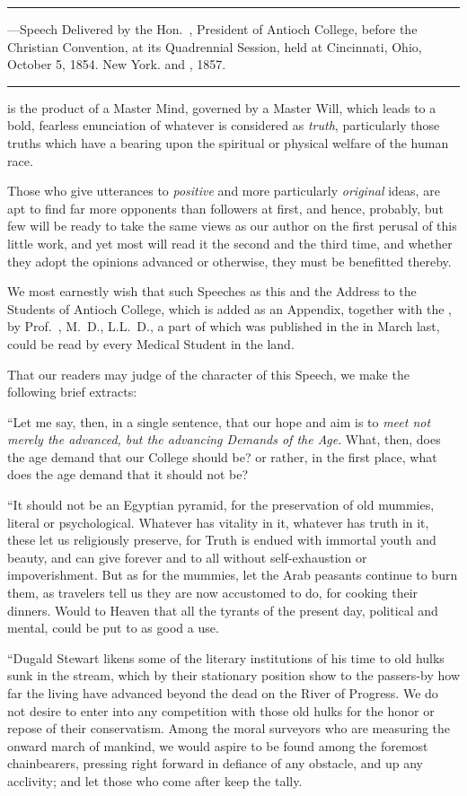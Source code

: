 
\fancybreak{* * *}
\footnotesize
{}---Speech Delivered by the Hon.~, President of
Antioch College, before the Christian Convention, at its Quadrennial Session, held at
Cincinnati, Ohio, October 5, 1854. New York.  and , 1857.
\plainbreak{1}
\normalsize

 is the product of a Master Mind, governed by a Master Will,
which leads to a bold, fearless enunciation of whatever is considered as
\emph{truth}, particularly those truths which have a bearing upon the spiritual
or physical welfare of the human race.

Those who give utterances to \emph{positive} and more particularly \emph{original}
ideas, are apt to find far more opponents than followers at first, and
hence, probably, but few will be ready to take the same views as our
author on the first perusal of this little work, and yet most will read it
the second and the third time, and whether they adopt the opinions
advanced or otherwise, they must be benefitted thereby.

We most earnestly wish that such Speeches as this and the Address
to the Students of Antioch College, which is added as an Appendix,
together with the , by Prof.~, M.~D., L.L.~D., a part of which was
published in the  in March last, could be read by every
Medical Student in the land.

That our readers may judge of the character of this Speech, we
make the following brief extracts:

``Let me say, then, in a single sentence, that our hope and aim is to
\emph{meet not merely the advanced, but the advancing Demands of the Age}.
What, then, does the age demand that our College should be? or rather,
in the first place, what does the age demand that it should not be?

``It should not be an Egyptian pyramid, for the preservation of old
mummies, literal or psychological. Whatever has vitality in it, whatever
has truth in it, these let us religiously preserve, for Truth is endued
with immortal youth and beauty, and can give forever and to all without
self-exhaustion or impoverishment. But as for the mummies, let
the Arab peasants continue to burn them, as travelers tell us they are
now accustomed to do, for cooking their dinners. Would to Heaven
that all the tyrants of the present day, political and mental, could be
put to as good a use.

``Dugald Stewart likens some of the literary institutions of his time
to old hulks sunk in the stream, which by their stationary position
show to the passers-by how far the living have advanced beyond the
dead on the River of Progress. We do not desire to enter into any
competition with those old hulks for the honor or repose of their conservatism.
Among the moral surveyors who are measuring the onward
march of mankind, we would aspire to be found among the foremost
chainbearers, pressing right forward in defiance of any obstacle, and
up any acclivity; and let those who come after keep the tally.\endinput
